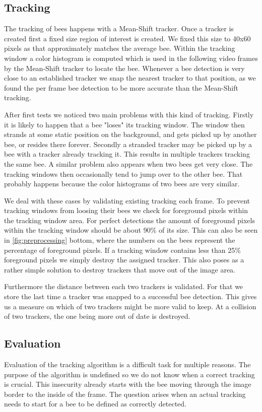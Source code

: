 \documentclass[10pt,a4paper]{article}
\begin{document}
\subsection{Tracking}
The tracking of bees happens with a Mean-Shift tracker. Once a tracker is created first a fixed size region of interest is created. We fixed this size to 40x60 pixels as that approximately matches the average bee. Within the tracking window a color histogram is computed which is used in the following video frames by the Mean-Shift tracker to locate the bee. Whenever a bee detection is very close to an established tracker we snap the nearest tracker to that position, as we found the per frame bee detection to be more accurate than the Mean-Shift tracking.

After first tests we noticed two main problems with this kind of tracking. Firstly it is likely to happen that a bee "loses" its tracking window. The window then strands at some static position on the background, and gets picked up by another bee, or resides there forever. Secondly a stranded tracker may be picked up by a bee with a tracker already tracking it. This results in multiple trackers tracking the same bee. A similar problem also appears when two bees get very close. The tracking windows then occasionally tend to jump over to the other bee. That probably happens because the color histograms of two bees are very similar. 

We deal with these cases by validating existing tracking each frame. To prevent tracking windows from loosing their bees we check for foreground pixels within the tracking window area. For perfect detections the amount of foreground pixels within the tracking window should be about 90\% of its size. This can also be seen in \ref{fig:preprocessing} bottom, where the numbers on the bees represent the percentage of foreground pixels. If a tracking window contains less than 25\% foreground pixels we simply destroy the assigned tracker. This also poses as a rather simple solution to destroy trackers that move out of the image area.

Furthermore the distance between each two trackers is validated. For that we store the last time a tracker was snapped to a successful bee detection. This gives us a measure on which of two trackers might be more valid to keep. At a collision of two trackers, the one being more out of date is destroyed.

\subsection{Evaluation}
Evaluation of the tracking algorithm is a difficult task for multiple reasons. The purpose of the algorithm is undefined so we do not know when a correct tracking is crucial. This insecurity already starts with the bee moving through the image border to the inside of the frame. The question arises when an actual tracking needs to start for a bee to be defined as correctly detected. 
\end{document}
